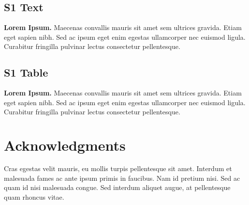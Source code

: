 \documentclass[10pt,letterpaper]{article}
\begin{document}
\subsection*{S1 Text}
\label{S1_Text}
{\bf Lorem Ipsum.} Maecenas convallis mauris sit amet sem ultrices gravida. Etiam eget sapien nibh. Sed ac ipsum eget enim egestas ullamcorper nec euismod ligula. Curabitur fringilla pulvinar lectus consectetur pellentesque.

\subsection*{S1 Table}
\label{S1_Table}
{\bf Lorem Ipsum.} Maecenas convallis mauris sit amet sem ultrices gravida. Etiam eget sapien nibh. Sed ac ipsum eget enim egestas ullamcorper nec euismod ligula. Curabitur fringilla pulvinar lectus consectetur pellentesque.

\section*{Acknowledgments}
Cras egestas velit mauris, eu mollis turpis pellentesque sit amet. Interdum et malesuada fames ac ante ipsum primis in faucibus. Nam id pretium nisi. Sed ac quam id nisi malesuada congue. Sed interdum aliquet augue, at pellentesque quam rhoncus vitae.

\nolinenumbers

%
%
% 


\end{document}
